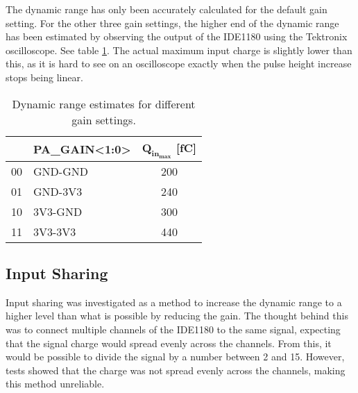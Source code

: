 \documentclass[../main/thesis.tex]{subfiles}
\begin{document}
The dynamic range has only been accurately calculated for the default gain setting. For the other three gain settings, the higher end of the dynamic range has been estimated by observing the output of the IDE1180 using the Tektronix oscilloscope. See table \ref{tab-dynrange-estimate}. The actual maximum input charge is slightly lower than this, as it is hard to see on an oscilloscope exactly when the pulse height increase stops being linear.
\begin{table}[h!]
	\begin{center}
		\caption{Dynamic range estimates for different gain settings.}
		\label{tab-dynrange-estimate}
		\begin{tabular}{clc}\toprule
			&\textbf{PA\_GAIN<1:0>} & \textbf{$\mathbf{Q_{in_{max}}}$ [fC]}   \\ \midrule
		    00&GND-GND     & 200   \\
			01&GND-3V3     & 240       \\
			10&3V3-GND     & 300    \\
			11&3V3-3V3     & 440   \\ \bottomrule
		\end{tabular}
	\end{center}
\end{table}

\subsection{Input Sharing}
\label{ide-inputshare}

Input sharing was investigated as a method to increase the dynamic range to a higher level than what is possible by reducing the gain. The thought behind this was to connect multiple channels of the IDE1180 to the same signal, expecting that the signal charge would spread evenly across the channels. From this, it would be possible to divide the signal by a number between 2 and 15. However, tests showed that the charge was not spread evenly across the channels, making this method unreliable. 

\end{document}
